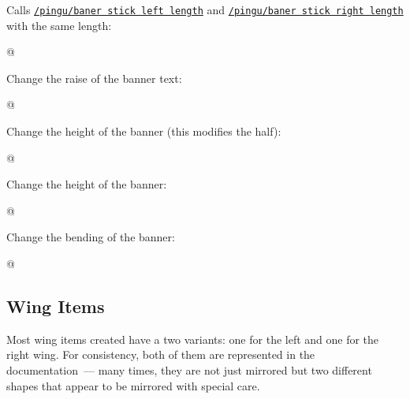 \documentclass[parskip=half,english,numbers=noenddot,footnotes=nomultiple,oneside]{scrartcl}
\def\lpingu#1{\lstinline[style=lstpingu,language=pingulang]'#1'}
\newcommand*\keyref[2][/pingu/]{\hyperref[pk:#1#2]{\lpingu{#1#2}}}
\begin{document}
Calls \keyref{baner stick left length} and \keyref{baner stick right length} with the same length:
\begin{tcblisting}{@}
\begin{tikzpicture}
	\pingu[banner, banner sticks length=9mm]
\end{tikzpicture}
\end{tcblisting}
\endsubkeyexplain

Change the raise of the banner text:
\begin{tcblisting}{@}
\begin{tikzpicture}
	\pingu[banner, banner raise=2mm]
\end{tikzpicture}
\end{tcblisting}
\endsubkeyexplain

Change the height of the banner (this modifies the half):
\begin{tcblisting}{@}
\begin{tikzpicture}
	\pingu[banner, banner height=6mm]
\end{tikzpicture}
\end{tcblisting}
\endsubkeyexplain

Change the height of the banner:
\begin{tcblisting}{@}
\begin{tikzpicture}
	\pingu[banner, banner font=\itshape]
\end{tikzpicture}
\end{tcblisting}
\endsubkeyexplain

Change the bending of the banner:
\begin{tcblisting}{@}
\begin{tikzpicture}
	\pingu[banner, banner bent=0]
\end{tikzpicture}
\end{tcblisting}
\endsubkeyexplain

\subsection{Wing Items}
\label{sub:wing-items}Most wing items created have a two variants: one for the left and one for the right wing. For consistency, both of them are represented in the documentation~--- many times, they are not just mirrored but two different shapes that appear to be mirrored with special care.
\end{document}
